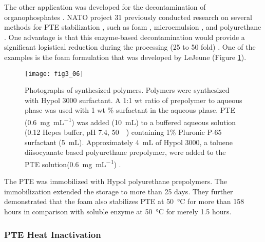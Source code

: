 \begin{refsection}
The other application was developed for the decontamination of
organophosphates
\cite{Cheng1996,LeJeune1997a,Little1989,Chen1998,Gill2000,Havens1993,Masson2009a}.
NATO project 31 previously conducted research on several methods for PTE
stabilization \cite{Defrank}, such as foam \cite{LeJeune1997a}, microemulsion
\cite{Cheng1996}, and polyurethane \cite{Defrank}. One advantage is that this
enzyme-based decontamination would provide a significant logistical reduction
during the processing (25 to 50 fold) \cite{Defrank}. One of the examples is
the foam formulation that was developed by LeJeune 
\cite{LeJeune1997a} (Figure \ref{fig:pte-foam}).
\begin{figure}[htbp]
    \centering \texttt{[image: fig3\_06]}
    \caption[Photographs of synthesized polymers. Polymers were synthesized
    with Hypol 3000 surfactant. A 1:1 wt ratio of prepolymer to aqueous phase
    was used with 1 wt \% surfactant in the aqueous phase. PTE
    (\SI{0.6}{\mg\per\mL}) was added (\SI{10}{\mL}) to a buffered aqueous
    solution (\SI{0.12}{\Molar} Hepes buffer, pH 7.4,
    \SI{50}{\milli\Molar}) containing 1 \% Pluronic P-65 surfactant
    (\SI{5}{\mL}). Approximately \SI{4}{\mL} of Hypol 3000, a toluene
    diisocyanate based polyurethane prepolymer, were added to the PTE
solution(\SI{0.6}{\mg\per\mL}).]{Photographs of synthesized polymers. Polymers
    were synthesized with Hypol 3000 surfactant. A 1:1 wt ratio of prepolymer
    to aqueous phase was used with 1 wt \% surfactant in the aqueous phase. PTE
    (\SI{0.6}{\mg\per\mL}) was added (\SI{10}{\mL}) to a buffered aqueous
    solution (\SI{0.12}{\Molar} Hepes buffer, pH 7.4,
    \SI{50}{\milli\Molar}) containing 1\% Pluronic P-65 surfactant
    (\SI{5}{\mL}). Approximately \SI{4}{\mL} of Hypol 3000, a toluene
    diisocyanate based polyurethane prepolymer, were added to the PTE
    solution(\SI{0.6}{\mg\per\mL}) \cite{LeJeune1997a}.} 
    \label{fig:pte-foam}
\end{figure}

The PTE was immobilized with Hypol polyurethane prepolymers. The immobilization
extended the storage to more than 25 days. They further demonstrated that the
foam also stabilizes PTE at \SI{50}{\celsius} for more than 158 hours in
comparison with soluble enzyme at \SI{50}{\celsius} for merely 1.5 hours. 

\subsubsection{PTE Heat Inactivation}


\end{refsection}
